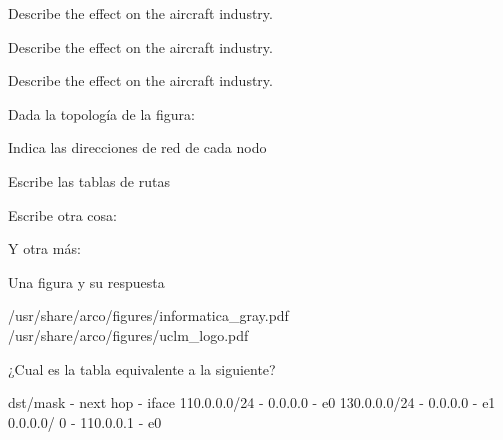 \documentclass[english]{arco-exam}
\begin{document}
\begin{questions}
\begin{multiQuestion}[12]
\begin{parts}
    \subQuestion[]
      Describe the effect on the aircraft industry.


    \subQuestion[]
      Describe the effect on the aircraft industry.


    \subQuestion[]
      Describe the effect on the aircraft industry.


    \end{parts}
  \end{multiQuestion}

  \begin{multiQuestion}[4]
    Dada la topología de la figura:

    \begin{parts}
      \subQuestion
      Indica las direcciones de red de cada nodo


      \subQuestion[1]
      Escribe las tablas de rutas


      \subQuestion
      Escribe otra cosa:


      \subQuestion
      Y otra más:

    \end{parts}

  \end{multiQuestion}


\begin{simpleQuestion}[5]
  Una figura y su respuesta

                     {/usr/share/arco/figures/informatica_gray.pdf}
                     {/usr/share/arco/figures/uclm_logo.pdf}
\end{simpleQuestion}


\begin{simpleQuestion}[8]
  ¿Cual es la tabla equivalente a la siguiente?

  \begin{listing}[style=pre]
  dst/mask     - next hop  - iface
  110.0.0.0/24 -   0.0.0.0 - e0
  130.0.0.0/24 -   0.0.0.0 - e1
  0.0.0.0/ 0   - 110.0.0.1 - e0
  \end{listing}


\end{simpleQuestion}
\end{questions}
\end{document}
